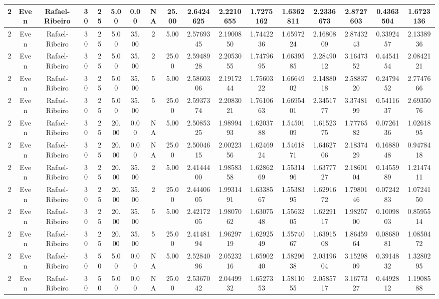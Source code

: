 \begin{longtable}{ | c | c | c | c | c | c | c | c | c | c | c | c | c | c | c | c | c | }
	\hline
	2	&	Even	&	Rafael-Ribeiro	&	30	&	25	&	5.00	&	0.00	&	NA	&	25.00	&	2.6424625	&	2.2210655	&	1.7275162	&	1.6362811	&	2.2336673	&	2.8727603	&	0.4363504	&	1.6723136 \\
	\hline
	2	&	Even	&	Rafael-Ribeiro	&	30	&	25	&	5.00	&	35.00	&	2	&	5.00	&	2.5769345	&	2.1900850	&	1.7442236	&	1.6597224	&	2.1680809	&	2.8743243	&	0.3392457	&	2.1338936 \\
	\hline
	2	&	Even	&	Rafael-Ribeiro	&	30	&	25	&	5.00	&	35.00	&	2	&	25.00	&	2.5948928	&	2.2053055	&	1.7479695	&	1.6639585	&	2.2849012	&	3.1647352	&	0.4454154	&	2.0842121 \\
	\hline
	2	&	Even	&	Rafael-Ribeiro	&	30	&	25	&	5.00	&	35.00	&	5	&	5.00	&	2.5860306	&	2.1917244	&	1.7560322	&	1.6664902	&	2.1488018	&	2.5883720	&	0.2479452	&	2.7747666 \\
	\hline
	2	&	Even	&	Rafael-Ribeiro	&	30	&	25	&	5.00	&	35.00	&	5	&	25.00	&	2.5937374	&	2.2083021	&	1.7610663	&	1.6695401	&	2.3451777	&	3.3748199	&	0.5411637	&	2.6935076 \\
	\hline
	2	&	Even	&	Rafael-Ribeiro	&	30	&	25	&	20.00	&	0.00	&	NA	&	5.00	&	2.5085325	&	1.9899493	&	1.6203788	&	1.5450109	&	1.6152375	&	1.7776582	&	0.0726136	&	1.0261895 \\
	\hline
	2	&	Even	&	Rafael-Ribeiro	&	30	&	25	&	20.00	&	0.00	&	NA	&	25.00	&	2.5004615	&	2.0022356	&	1.6246924	&	1.5461871	&	1.6462706	&	2.1837429	&	0.1688048	&	0.9478418 \\
	\hline
	2	&	Even	&	Rafael-Ribeiro	&	30	&	25	&	20.00	&	35.00	&	2	&	5.00	&	2.4144400	&	1.9858358	&	1.6286269	&	1.5531496	&	1.6377727	&	2.1860104	&	0.1455989	&	1.2147411 \\
	\hline
	2	&	Even	&	Rafael-Ribeiro	&	30	&	25	&	20.00	&	35.00	&	2	&	25.00	&	2.4440605	&	1.9931491	&	1.6338567	&	1.5538395	&	1.6291672	&	1.7980146	&	0.0724283	&	1.0724150 \\
	\hline
	2	&	Even	&	Rafael-Ribeiro	&	30	&	25	&	20.00	&	35.00	&	5	&	5.00	&	2.4217205	&	1.9807062	&	1.6307548	&	1.5563205	&	1.6229117	&	1.9825700	&	0.1009803	&	0.8595514 \\
	\hline
	2	&	Even	&	Rafael-Ribeiro	&	30	&	25	&	20.00	&	35.00	&	5	&	25.00	&	2.4148194	&	1.9629719	&	1.6292549	&	1.5574067	&	1.6391508	&	1.8645964	&	0.0868081	&	1.0850472 \\
	\hline
	2	&	Even	&	Rafael-Ribeiro	&	30	&	50	&	5.00	&	0.00	&	NA	&	5.00	&	2.5284096	&	2.0523216	&	1.6590240	&	1.5829638	&	2.0319604	&	3.1529809	&	0.3914832	&	1.3280295 \\
	\hline
	2	&	Even	&	Rafael-Ribeiro	&	30	&	50	&	5.00	&	0.00	&	NA	&	25.00	&	2.5367042	&	2.0449932	&	1.6527353	&	1.5811055	&	2.0585717	&	3.1677327	&	0.4492812	&	1.1908588 \\

\end{longtable}
